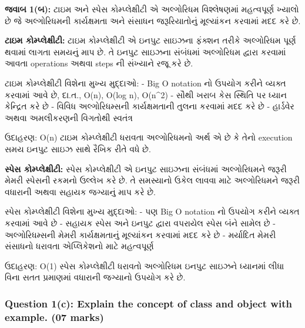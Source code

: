 \textbf{જવાબ 1(બ):} ટાઇમ અને સ્પેસ કોમ્પ્લેક્ષીટી એ અલ્ગોરિધમ વિશ્લેષણમાં મહત્વપૂર્ણ
ખ્યાલો છે જે અલ્ગોરિધમની કાર્યક્ષમતા અને સંસાધન જરૂરિયાતોનું મૂલ્યાંકન કરવામાં મદદ કરે
છે.

\textbf{ટાઇમ કોમ્પ્લેક્ષીટી:} ટાઇમ કોમ્પ્લેક્ષીટી એ ઇનપુટ સાઇઝના ફંક્શન તરીકે
અલ્ગોરિધમ પૂર્ણ થવામાં લાગતા સમયનું માપ છે. તે ઇનપુટ સાઇઝના સંબંધમાં અલ્ગોરિધમ દ્વારા
કરવામાં આવતા operations અથવા steps ની સંખ્યાને રજૂ કરે છે.

ટાઇમ કોમ્પ્લેક્ષીટી વિશેના મુખ્ય મુદ્દાઓ: - Big O notation નો ઉપયોગ કરીને વ્યક્ત
કરવામાં આવે છે, દા.ત., O(n), O(log n), O(n\^{}2) - સૌથી ખરાબ કેસ સ્થિતિ પર
ધ્યાન કેન્દ્રિત કરે છે - વિવિધ અલ્ગોરિધમ્સની કાર્યક્ષમતાની તુલના કરવામાં મદદ કરે છે -
હાર્ડવેર અથવા અમલીકરણની વિગતોથી સ્વતંત્ર

ઉદાહરણ: O(n) ટાઇમ કોમ્પ્લેક્ષીટી ધરાવતા અલ્ગોરિધમનો અર્થ એ છે કે તેનો execution
સમય ઇનપુટ સાઇઝ સાથે રૈખિક રીતે વધે છે.

\textbf{સ્પેસ કોમ્પ્લેક્ષીટી:} સ્પેસ કોમ્પ્લેક્ષીટી એ ઇનપુટ સાઇઝના સંબંધમાં અલ્ગોરિધમને
જરૂરી મેમરી સ્પેસની રકમનો ઉલ્લેખ કરે છે. તે સમસ્યાનો ઉકેલ લાવવા માટે અલ્ગોરિધમને જરૂરી
વધારાની અથવા સહાયક જગ્યાનું માપ કરે છે.

સ્પેસ કોમ્પ્લેક્ષીટી વિશેના મુખ્ય મુદ્દાઓ: - પણ Big O notation નો ઉપયોગ કરીને વ્યક્ત
કરવામાં આવે છે - સહાયક સ્પેસ અને ઇનપુટ દ્વારા વપરાયેલ સ્પેસ બંને સામેલ છે - અલ્ગોરિધમ્સની
મેમરી કાર્યક્ષમતાનું મૂલ્યાંકન કરવામાં મદદ કરે છે - મર્યાદિત મેમરી સંસાધનો ધરાવતા
એપ્લિકેશનો માટે મહત્વપૂર્ણ

ઉદાહરણ: O(1) સ્પેસ કોમ્પ્લેક્ષીટી ધરાવતો અલ્ગોરિધમ ઇનપુટ સાઇઝને ધ્યાનમાં લીધા વિના
સતત પ્રમાણમાં વધારાની જગ્યાનો ઉપયોગ કરે છે.

\begin{Shaded}
\begin{Highlighting}[]
\end{Highlighting}
\end{Shaded}

\hypertarget{question-1c-explain-the-concept-of-class-and-object-with-example.-07-marks}{%
\subsubsection{Question 1(c): Explain the concept of class and object
with example. (07
marks)}\label{question-1c-explain-the-concept-of-class-and-object-with-example.-07-marks}}

